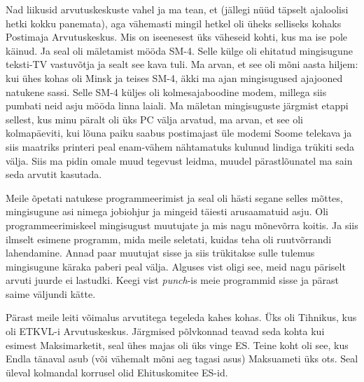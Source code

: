 Nad liikusid arvutuskeskuste vahel ja ma tean, et (jällegi nüüd täpselt ajaloolisi hetki kokku panemata), aga vähemasti mingil hetkel oli üheks selliseks kohaks Postimaja Arvutuskeskus. Mis on iseenesest üks väheseid kohti, kus ma ise pole käinud. Ja seal oli mäletamist mööda SM-4. Selle külge oli ehitatud mingisugune teksti-TV vastuvõtja  ja sealt see kava tuli.  Ma arvan, et see oli mõni aasta hiljem: kui ühes kohas oli Minsk ja teises SM-4, äkki ma ajan mingisugused ajajooned natukene sassi. Selle SM-4  küljes oli kolmesajaboodine modem, millega siis pumbati neid asju mööda linna laiali. Ma mäletan mingisuguste järgmist etappi sellest, kus  minu päralt oli üks PC välja arvatud, ma arvan, et see oli kolmapäeviti, kui lõuna paiku saabus postimajast üle modemi Soome telekava ja siis maatriks printeri peal enam-vähem nähtamatuks kulunud lindiga trükiti seda välja. Siis ma pidin omale  muud tegevust leidma, muudel pärastlõunatel ma sain seda arvutit kasutada.


Meile õpetati natukese programmeerimist ja seal oli hästi segane selles mõttes, mingisugune asi nimega jobiohjur ja mingeid täiesti arusaamatuid asju. Oli programmeerimiskeel mingisugust  muutujate ja mis nagu mõnevõrra koitis. Ja siis ilmselt esimene programm, mida meile seletati, kuidas teha oli ruutvõrrandi lahendamine. Annad paar muutujat sisse ja siis trükitakse sulle tulemus mingisugune käraka  paberi peal välja. Alguses vist oligi see,  meid nagu päriselt arvuti juurde ei lastudki. Keegi vist \emph{punch}-is meie programmid sisse ja pärast saime väljundi kätte. 

Pärast meile leiti võimalus arvutitega tegeleda kahes kohas.  Üks oli Tihnikus, kus oli ETKVL-i Arvutuskeskus. Järgmised põlvkonnad teavad seda kohta kui esimest Maksimarketit, seal ühes majas oli üks vinge ES. Teine koht oli see, kus Endla tänaval asub (või vähemalt mõni aeg tagasi asus) Maksuameti üks ots. Seal  üleval kolmandal korrusel olid Ehituskomitee ES-id. 

